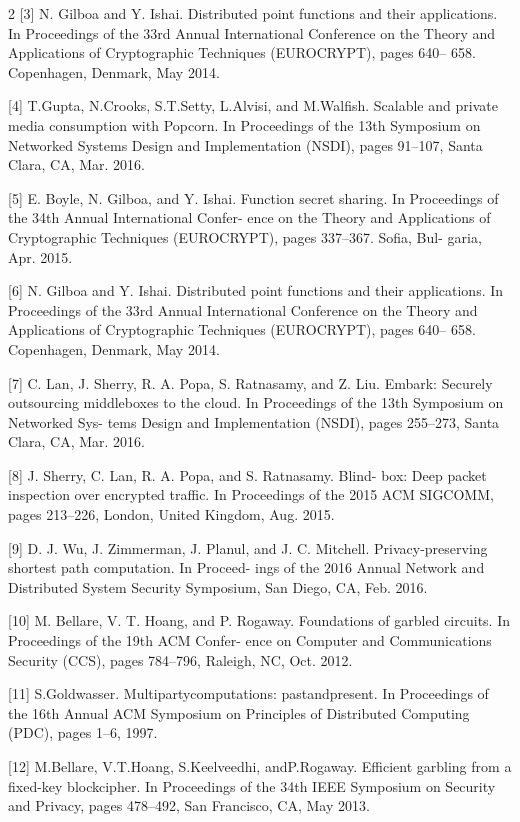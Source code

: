 \documentclass[12pt,a4paper]{article}
\begin{document}
\begin{multicols}{2}
[3] N. Gilboa and Y. Ishai. Distributed point 
functions and their applications. In Proceedings of 
the 33rd Annual International Conference on the 
Theory and Applications of Cryptographic Techniques 
(EUROCRYPT), pages 640– 658. Copenhagen, Denmark, 
May 2014.

[4] T.Gupta, N.Crooks, S.T.Setty, L.Alvisi, and  M.Walfish. Scalable and private media consumption with Popcorn. In Proceedings of the 13th Symposium on Networked Systems Design and Implementation (NSDI), pages 91–107, Santa Clara, CA, Mar. 2016.

[5] E. Boyle, N. Gilboa, and Y. Ishai. Function secret sharing. In Proceedings of the 34th Annual International Confer- ence on the Theory and Applications of Cryptographic Techniques (EUROCRYPT), pages 337–367. Sofia, Bul- garia, Apr. 2015.

[6] N. Gilboa and Y. Ishai. Distributed point functions and their applications. In Proceedings of the 33rd Annual International Conference on the Theory and Applications of Cryptographic Techniques (EUROCRYPT), pages 640– 658. Copenhagen, Denmark, May 2014.

[7] C. Lan, J. Sherry, R. A. Popa, S. Ratnasamy, and Z. Liu. Embark: Securely outsourcing middleboxes to the cloud. In Proceedings of the 13th Symposium on Networked Sys- tems Design and Implementation (NSDI), pages 255–273, Santa Clara, CA, Mar. 2016.

[8] J. Sherry, C. Lan, R. A. Popa, and S. Ratnasamy. Blind- box: Deep packet inspection over encrypted traffic. In Proceedings of the 2015 ACM SIGCOMM, pages 213–226, London, United Kingdom, Aug. 2015.

[9] D. J. Wu, J. Zimmerman, J. Planul, and J. C. Mitchell. Privacy-preserving shortest path computation. In Proceed- ings of the 2016 Annual Network and Distributed System Security Symposium, San Diego, CA, Feb. 2016.

[10] M. Bellare, V. T. Hoang, and P. Rogaway. Foundations of garbled circuits. In Proceedings of the 19th ACM Confer- ence on Computer and Communications Security (CCS), pages 784–796, Raleigh, NC, Oct. 2012.

[11] S.Goldwasser. Multipartycomputations: pastandpresent. In Proceedings of the 16th Annual ACM Symposium on Principles of Distributed Computing (PDC), pages 1–6, 1997.

[12] M.Bellare, V.T.Hoang, S.Keelveedhi, andP.Rogaway. Efficient garbling from a fixed-key blockcipher. In Proceedings of the 34th IEEE Symposium on Security and Privacy, pages 478–492, San Francisco, CA, May 2013.


\end{multicols}
\end{document}
